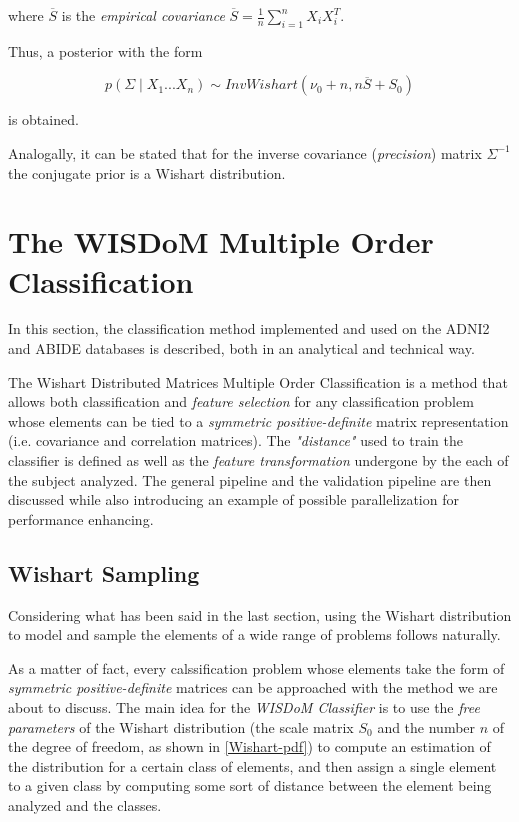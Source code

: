 \documentclass[12pt,openright,twoside,a4paper]{book}
\begin{document}
where $\overline{S}$ is the \textit{empirical covariance} $\overline{S}=\frac{1}{n}\sum_{i=1}
^nX_iX_i^T$.

Thus, a posterior with the form

\begin{equation}
p(\Sigma\mid X_1...X_n)\sim InvWishart(\nu_0+n, n\overline{S}+S_0)
\end{equation}

is obtained.

Analogally, it can be stated that for the inverse covariance (\textit{precision}) matrix $\Sigma^{-1}$ the conjugate prior is a Wishart distribution.

\chapter{The WISDoM Multiple Order Classification}

In this section, the classification method implemented and used on the ADNI2 and ABIDE databases is described, both in an analytical and technical way.

The Wishart Distributed Matrices Multiple Order Classification is a method that allows both classification and \textit{feature selection} for any classification problem whose elements can be tied to a \textit{symmetric positive-definite} matrix representation (i.e. covariance and correlation matrices).
The \textit{"distance"} used to train the classifier is defined as well as the \textit{feature transformation} undergone by the each of the subject analyzed.
The general pipeline and the validation pipeline are then discussed while also introducing an example of possible parallelization for performance enhancing.

\section{Wishart Sampling}

Considering what has been said in the last section, using the Wishart distribution to model and sample the elements of a wide range of problems follows naturally.

As a matter of fact, every calssification problem whose elements take the form of \textit{symmetric positive-definite} matrices can be approached with the method we are about to discuss.
The main idea for the \textit{WISDoM Classifier} is to use the \textit{free parameters} of the Wishart distribution (the scale matrix $S_0$ and the number $n$ of the degree of freedom, as shown in \ref{Wishart-pdf}) to compute an estimation of the distribution for a certain class of elements, and then assign a single element to a given class by computing some sort of distance between the element being analyzed and the classes.
\end{document}

